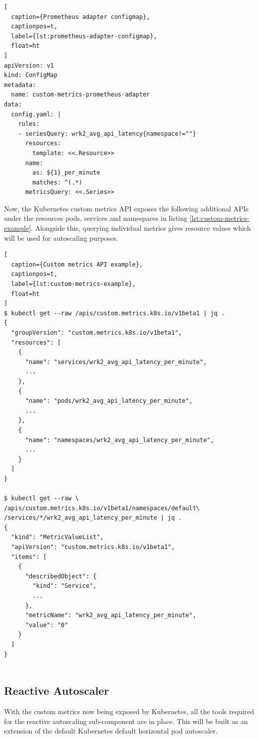 \begin{lstlisting}[
  caption={Prometheus adapter configmap},
  captionpos=t,
  label={lst:prometheus-adapter-configmap},
  float=ht
]
apiVersion: v1
kind: ConfigMap
metadata:
  name: custom-metrics-prometheus-adapter
data:
  config.yaml: |
    rules:
    - seriesQuery: wrk2_avg_api_latency{namespace!=""}
      resources:
        template: <<.Resource>>
      name:
        as: ${1}_per_minute
        matches: ^(.*)
      metricsQuery: <<.Series>>
\end{lstlisting}

Now, the Kubernetes custom metrics API exposes the following additional APIs under the resources pods, services and namespaces in listing \ref{lst:custom-metrics-example}. Alongside this, querying individual metrics gives resource values which will be used for autoscaling purposes.

\begin{lstlisting}[
  caption={Custom metrics API example},
  captionpos=t,
  label={lst:custom-metrics-example},
  float=ht
]
$ kubectl get --raw /apis/custom.metrics.k8s.io/v1beta1 | jq .
{
  "groupVersion": "custom.metrics.k8s.io/v1beta1",
  "resources": [
    {
      "name": "services/wrk2_avg_api_latency_per_minute",
      ...
    },
    {
      "name": "pods/wrk2_avg_api_latency_per_minute",
      ...
    },
    {
      "name": "namespaces/wrk2_avg_api_latency_per_minute",
      ...
    }
  ]
}

$ kubectl get --raw \
/apis/custom.metrics.k8s.io/v1beta1/namespaces/default\
/services/*/wrk2_avg_api_latency_per_minute | jq .
{
  "kind": "MetricValueList",
  "apiVersion": "custom.metrics.k8s.io/v1beta1",
  "items": [
    {
      "describedObject": {
        "kind": "Service",
        ...
      },
      "metricName": "wrk2_avg_api_latency_per_minute",
      "value": "0"
    }
  ]
}


\end{lstlisting}

\subsection{Reactive Autoscaler}
\label{subsec:reactive-auto-subsection}

With the custom metrics now being exposed by Kubernetes, all the tools required for the reactive autoscaling sub-component are in place. This will be built as an extension of the default Kubernetes default horizontal pod autoscaler.\par

